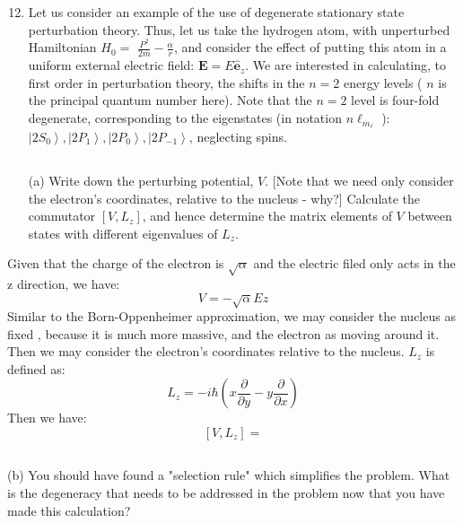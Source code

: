 \documentclass[12pt]{article}
\begin{document}
\section{}
\begin{enumerate}
  \setcounter{enumi}{11}
  \item Let us consider an example of the use of degenerate stationary state perturbation theory. Thus, let us take the hydrogen atom, with unperturbed Hamiltonian $H_{0}=$ $\frac{P^{2}}{2 m}-\frac{\alpha}{r}$, and consider the effect of putting this atom in a uniform external electric field: $\mathbf{E}=E \hat{\mathbf{e}}_{z}$. We are interested in calculating, to first order in perturbation theory, the shifts in the $n=2$ energy levels ( $n$ is the principal quantum number here). Note that the $n=2$ level is four-fold degenerate, corresponding to the eigenstates (in notation $n \ell_{m_{\ell}}$ ): $\left|2 S_{0}\right\rangle,\left|2 P_{1}\right\rangle,\left|2 P_{0}\right\rangle,\left|2 P_{-1}\right\rangle$, neglecting spins.
\subsection{}
(a) Write down the perturbing potential, $V$. [Note that we need only consider the electron's coordinates, relative to the nucleus - why?] Calculate the commutator $\left[V, L_{z}\right]$, and hence determine the matrix elements of $V$ between states with different eigenvalues of $L_{z}$.
\end{enumerate}
Given that the charge of the electron is $\sqrt{\alpha }$ and the electric filed only acts in the z direction, we have:
\begin{equation}
  V = -\sqrt{\alpha} E z
\end{equation}
Similar to the Born-Oppenheimer approximation, we may consider the nucleus as fixed , because it is much more massive, and the electron as moving around it. Then we may consider the electron's coordinates relative to the nucleus. $L_z$ is defined as:
\begin{equation}
  L_z = -i\hbar \left( x \frac{\partial}{\partial y} - y \frac{\partial}{\partial x} \right)
\end{equation}
Then we have:
\begin{equation}
  \left[V, L_{z}\right] = 
\end{equation}
\subsection{}
(b) You should have found a "selection rule" which simplifies the problem. What is the degeneracy that needs to be addressed in the problem now that you have made this calculation?
\end{document}
